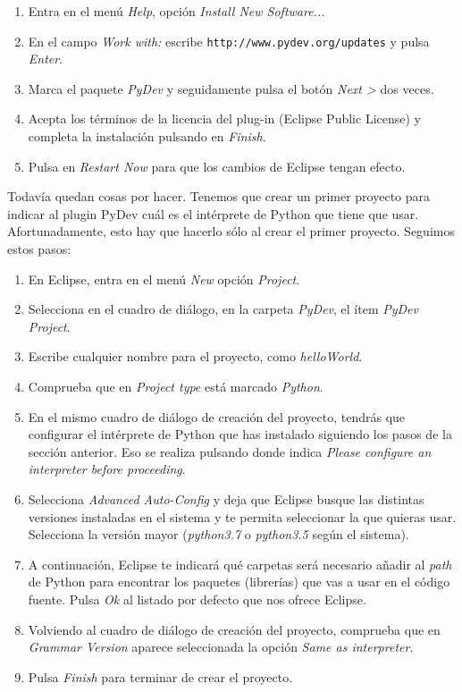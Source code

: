 \begin{enumerate}
	\item Entra en el menú \emph{Help}, opción \emph{Install New Software...}
	\item En el campo \emph{Work with:} escribe \texttt{http://www.pydev.org/updates} y pulsa \emph{Enter}.
	\item Marca el paquete \emph{PyDev} y seguidamente pulsa el botón \emph{Next >} dos veces.
	\item Acepta los términos de la licencia del plug-in (Eclipse Public License) y completa la instalación pulsando en \emph{Finish}.
	\item Pulsa en \emph{Restart Now} para que los cambios de Eclipse tengan efecto.
\end{enumerate}

Todavía quedan cosas por hacer. Tenemos que crear un primer proyecto para indicar al plugin PyDev cuál es el intérprete de Python que tiene que usar. Afortunadamente, esto hay que hacerlo sólo al crear el primer proyecto. Seguimos estos pasos:

\begin{enumerate}
	\item En Eclipse, entra en el menú \emph{New} opción \emph{Project}.
	\item Selecciona en el cuadro de diálogo, en la carpeta \emph{PyDev}, el ítem \emph{PyDev Project}. 
	\item Escribe cualquier nombre para el proyecto, como \emph{helloWorld}.
	\item Comprueba que en \emph{Project type} está marcado \emph{Python}. 
	\item En el mismo cuadro de diálogo de creación del proyecto, tendrás que configurar el intérprete de Python que has instalado siguiendo los pasos de la sección anterior. Eso se realiza pulsando donde indica \emph{Please configure an interpreter before proceeding}. 
	\item Selecciona \emph{Advanced Auto-Config} y deja que Eclipse busque las distintas versiones instaladas en el sistema y te permita seleccionar la que quieras usar. Selecciona la versión mayor (\emph{python3.7} o \emph{python3.5} según el sistema). 
	\item A continuación, Eclipse te indicará qué carpetas será necesario añadir al \emph{path} de Python para encontrar los paquetes (librerías) que vas a usar en el código fuente. Pulsa \emph{Ok} al listado por defecto que nos ofrece Eclipse. 
	\item Volviendo al cuadro de diálogo de creación del proyecto, comprueba que en \emph{Grammar Version} aparece seleccionada la opción \emph{Same as interpreter}. 
	\item Pulsa \emph{Finish} para terminar de crear el proyecto. 
\end{enumerate}

